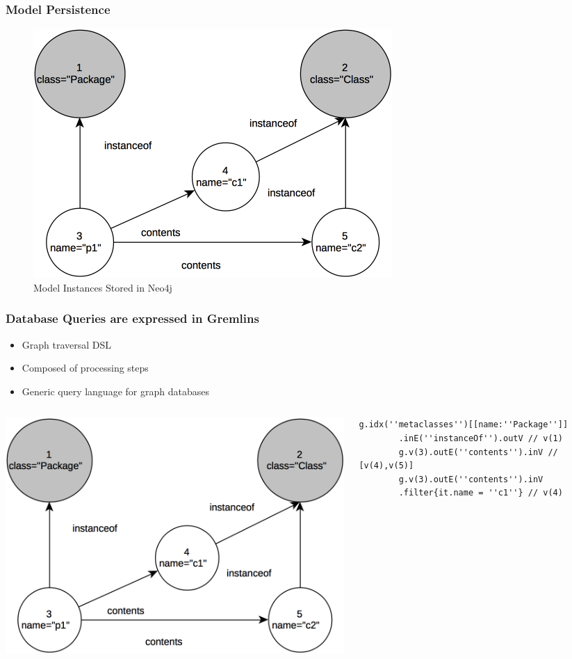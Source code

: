 \documentclass[10pt]{beamer}
\begin{document}
\begin{frame}[c]\frametitle{Model Persistence}
	\begin{figure}[htbp]
		\centering
		\includegraphics[width=.6\linewidth]{mogwai-graph.png}
		\caption{Model Instances Stored in Neo4j}
	\end{figure}
\end{frame}

\begin{frame}[fragile]\frametitle{Database Queries are expressed in Gremlins}
	\begin{itemize}
	\item Graph traversal DSL
	\item Composed of processing steps
	\item Generic query language for graph databases
	\end{itemize}
	\begin{columns}
		\begin{column}{0.4\textwidth}
			\includegraphics[width=\linewidth]{mogwai-graph.png}
		\end{column}
		\begin{column}{0.6\textwidth}
      \begin{lstlisting}[language=gremlin]
        g.idx(''metaclasses'')[[name:''Package'']]
        .inE(''instanceOf'').outV // v(1)
        g.v(3).outE(''contents'').inV // [v(4),v(5)]
        g.v(3).outE(''contents'').inV
        .filter{it.name = ''c1''} // v(4)
      \end{lstlisting}
		\end{column}
	\end{columns}
	
\end{frame}
\end{document}

